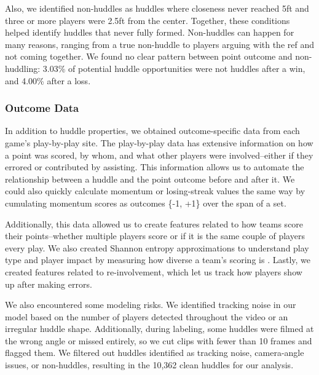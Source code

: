 \documentclass[12pt]{article}          %
\begin{document}
Also, we identified non-huddles as huddles where closeness never reached 5ft and three or more players were 2.5ft from the center. Together, these conditions helped identify huddles that never fully formed. Non-huddles can happen for many reasons, ranging from a true non-huddle to players arguing with the ref and not coming together. We found no clear pattern between point outcome and non-huddling: 3.03\% of potential huddle opportunities were not huddles after a win, and 4.00\% after a loss.

\subsubsection{Outcome Data}
In addition to huddle properties, we obtained outcome-specific data from each game's play-by-play site. The play-by-play data has extensive information on how a point was scored, by whom, and what other players were involved–either if they errored or contributed by assisting. This information allows us to automate the relationship between a huddle and the point outcome before and after it. We could also quickly calculate momentum or losing-streak values the same way by cumulating momentum scores as outcomes \{-1, +1\} over the span of a set. 

Additionally, this data allowed us to create features related to how teams score their points–whether multiple players score or if it is the same couple of players every play. We also created Shannon entropy approximations to understand play type and player impact by measuring how diverse a team's scoring is \citep{shannon1948}. Lastly, we created features related to re-involvement, which let us track how players show up after making errors.

We also encountered some modeling risks. We identified tracking noise in our model based on the number of players detected throughout the video or an irregular huddle shape. Additionally, during labeling, some huddles were filmed at the wrong angle or missed entirely, so we cut clips with fewer than 10 frames and flagged them. We filtered out huddles identified as tracking noise, camera-angle issues, or non-huddles, resulting in the 10,362 clean huddles for our analysis. 
\end{document}
